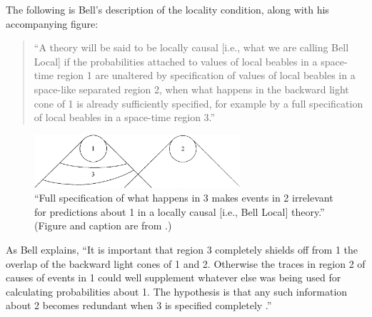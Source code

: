 \documentclass[aps,prc,onecolumn,12pt,nofootinbib]{revtex4-2}
\begin{document}
The following is Bell's description of the locality condition, along with his
accompanying figure:
\begin{quote}
``A theory will be said to be locally causal [i.e., what we are calling
Bell Local] if the probabilities attached to values of local beables
in a space-time region 1 are unaltered by specification of values of
local beables in a space-like separated region 2, when what happens in
the backward light cone of 1 is already sufficiently specified, for
example by a full specification of local beables in a space-time
region 3.''  \cite[page 240]{bell}
\end{quote}

\begin{figure}[h]
\begin{center}
\includegraphics[width=3.0in,clip]{./belllocality.eps}
\end{center}
\caption{
\label{fig1}
``Full specification of what happens in 3 makes events in 2 irrelevant
for predictions about 1 in a locally causal [i.e., Bell Local]
theory.''  (Figure and caption are from \cite[pg. 240]{bell}.)
}
\end{figure}

As Bell explains, ``It is important that region 3
completely shields off from 1 the overlap of the backward light cones
of 1 and 2.  Otherwise the traces in region 2 of causes of events in 1
could well supplement whatever else was being used for calculating
probabilities about 1.  The hypothesis is that any such information
about 2 becomes redundant when 3 is specified
completely \cite[pg. 240]{bell}.''
\end{document}
